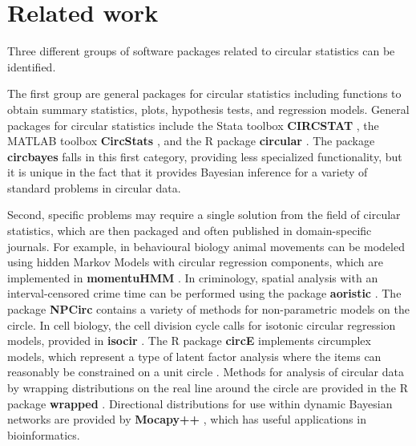 \documentclass{article}
\let\proglang=\textsf
\newcommand{\pkg}[1]{\textbf{#1}}
\begin{document}
\hypertarget{related-work}{%
	\section{Related work}\label{related-work}}

\label{relatedwork}

Three different groups of software packages related to circular
statistics can be identified.

The first group are general packages for circular statistics including
functions to obtain summary statistics, plots, hypothesis tests, and
regression models. General packages for circular statistics include the
\proglang{Stata} toolbox \pkg{CIRCSTAT} \citep{cox1998circstat}, the
\proglang{MATLAB} toolbox \pkg{CircStats} \citep{berens2009circstat},
and the \proglang{R} package \pkg{circular} \citep{lund2013package}. The
package \pkg{circbayes} falls in this first category, providing less
specialized functionality, but it is unique in the fact that it provides
Bayesian inference for a variety of standard problems in circular data.

Second, specific problems may require a single solution from the field
of circular statistics, which are then packaged and often published in
domain-specific journals. For example, in behavioural biology animal
movements can be modeled using hidden Markov Models with circular
regression components, which are implemented in \pkg{momentuHMM}
\citep{mcclintock2018momentuhmm}. In criminology, spatial analysis with
an interval-censored crime time can be performed using the package
\pkg{aoristic} \citep{kikuchi2015package}. The package \pkg{NPCirc}
\citep{JSSv061i09} contains a variety of methods for non-parametric
models on the circle. In cell biology, the cell division cycle calls for
isotonic circular regression models, provided in \pkg{isocir}
\citep{barragan2013isocir}. The \proglang{R} package \pkg{circE}
\citep{grassi2010circe} implements circumplex models, which represent a
type of latent factor analysis where the items can reasonably be
constrained on a unit circle \citep{browne1992circumplex}. Methods for
analysis of circular data by wrapping distributions on the real line
around the circle are provided in the \proglang{R} package \pkg{wrapped}
\citep{nadarajah2017wrapped}. Directional distributions for use within
dynamic Bayesian networks are provided by \pkg{Mocapy++}
\citep{paluszewski2010mocapy}, which has useful applications in
bioinformatics.
\end{document}
